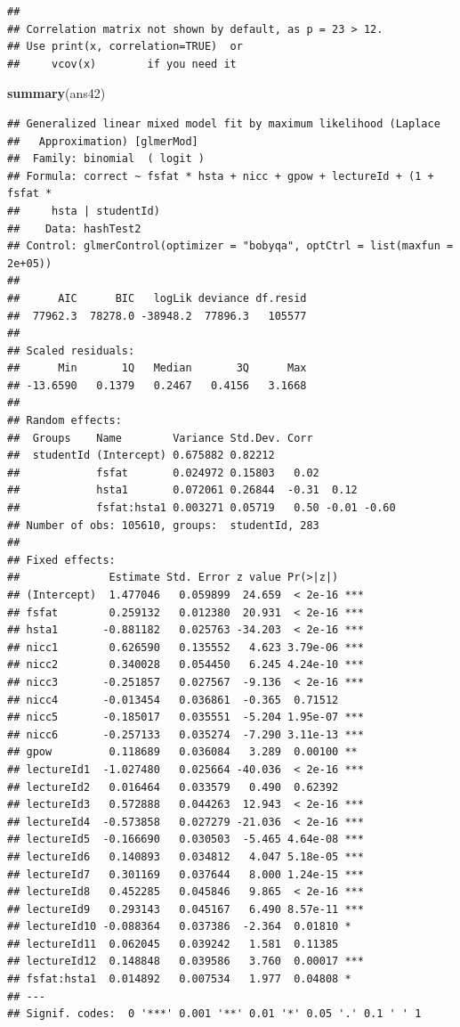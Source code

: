 \documentclass[
]{article}
\newenvironment{Shaded}{\begin{snugshade}}{\end{snugshade}}
\newcommand{\KeywordTok}[1]{\textcolor[rgb]{0.13,0.29,0.53}{\textbf{#1}}}
\newcommand{\NormalTok}[1]{#1}
\begin{document}
\begin{verbatim}
## 
## Correlation matrix not shown by default, as p = 23 > 12.
## Use print(x, correlation=TRUE)  or
##     vcov(x)        if you need it
\end{verbatim}

\begin{Shaded}
\begin{Highlighting}[]
\KeywordTok{summary}\NormalTok{(ans42)}
\end{Highlighting}
\end{Shaded}

\begin{verbatim}
## Generalized linear mixed model fit by maximum likelihood (Laplace
##   Approximation) [glmerMod]
##  Family: binomial  ( logit )
## Formula: correct ~ fsfat * hsta + nicc + gpow + lectureId + (1 + fsfat *  
##     hsta | studentId)
##    Data: hashTest2
## Control: glmerControl(optimizer = "bobyqa", optCtrl = list(maxfun = 2e+05))
## 
##      AIC      BIC   logLik deviance df.resid 
##  77962.3  78278.0 -38948.2  77896.3   105577 
## 
## Scaled residuals: 
##      Min       1Q   Median       3Q      Max 
## -13.6590   0.1379   0.2467   0.4156   3.1668 
## 
## Random effects:
##  Groups    Name        Variance Std.Dev. Corr             
##  studentId (Intercept) 0.675882 0.82212                   
##            fsfat       0.024972 0.15803   0.02            
##            hsta1       0.072061 0.26844  -0.31  0.12      
##            fsfat:hsta1 0.003271 0.05719   0.50 -0.01 -0.60
## Number of obs: 105610, groups:  studentId, 283
## 
## Fixed effects:
##              Estimate Std. Error z value Pr(>|z|)    
## (Intercept)  1.477046   0.059899  24.659  < 2e-16 ***
## fsfat        0.259132   0.012380  20.931  < 2e-16 ***
## hsta1       -0.881182   0.025763 -34.203  < 2e-16 ***
## nicc1        0.626590   0.135552   4.623 3.79e-06 ***
## nicc2        0.340028   0.054450   6.245 4.24e-10 ***
## nicc3       -0.251857   0.027567  -9.136  < 2e-16 ***
## nicc4       -0.013454   0.036861  -0.365  0.71512    
## nicc5       -0.185017   0.035551  -5.204 1.95e-07 ***
## nicc6       -0.257133   0.035274  -7.290 3.11e-13 ***
## gpow         0.118689   0.036084   3.289  0.00100 ** 
## lectureId1  -1.027480   0.025664 -40.036  < 2e-16 ***
## lectureId2   0.016464   0.033579   0.490  0.62392    
## lectureId3   0.572888   0.044263  12.943  < 2e-16 ***
## lectureId4  -0.573858   0.027279 -21.036  < 2e-16 ***
## lectureId5  -0.166690   0.030503  -5.465 4.64e-08 ***
## lectureId6   0.140893   0.034812   4.047 5.18e-05 ***
## lectureId7   0.301169   0.037644   8.000 1.24e-15 ***
## lectureId8   0.452285   0.045846   9.865  < 2e-16 ***
## lectureId9   0.293143   0.045167   6.490 8.57e-11 ***
## lectureId10 -0.088364   0.037386  -2.364  0.01810 *  
## lectureId11  0.062045   0.039242   1.581  0.11385    
## lectureId12  0.148848   0.039586   3.760  0.00017 ***
## fsfat:hsta1  0.014892   0.007534   1.977  0.04808 *  
## ---
## Signif. codes:  0 '***' 0.001 '**' 0.01 '*' 0.05 '.' 0.1 ' ' 1
\end{verbatim}
\end{document}
